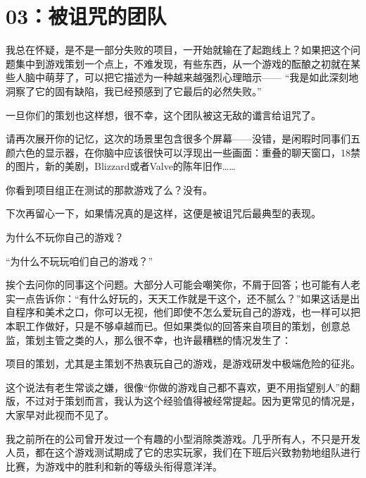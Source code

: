 \documentclass{article}
\begin{document}
{\centering\section*{03：被诅咒的团队}}





我总在怀疑，是不是一部分失败的项目，一开始就输在了起跑线上？如果把这个问题集中到游戏策划一个点上，不难发现，有些东西，从一个游戏的酝酿之初就在某些人脑中萌芽了，可以把它描述为一种越来越强烈心理暗示—— “我是如此深刻地洞察了它的固有缺陷，我已经预感到了它最后的必然失败。”



一旦你们的策划也这样想，很不幸，这个团队被这无敌的谶言给诅咒了。



请再次展开你的记忆，这次的场景里包含很多个屏幕——没错，是闲暇时同事们五颜六色的显示器，在你脑中应该很快可以浮现出一些画面：重叠的聊天窗口，18禁的图片，新的美剧，Blizzard或者Valve的陈年旧作……



你看到项目组正在测试的那款游戏了么？没有。



下次再留心一下，如果情况真的是这样，这便是被诅咒后最典型的表现。



为什么不玩你自己的游戏？



“为什么不玩玩咱们自己的游戏？”



挨个去问你的同事这个问题。大部分人可能会嘲笑你，不屑于回答；也可能有人老实一点告诉你：“有什么好玩的，天天工作就是干这个，还不腻么？”如果这话是出自程序和美术之口，你可以无视，他们即使不怎么爱玩自己的游戏，也一样可以把本职工作做好，只是不够卓越而已。但如果类似的回答来自项目的策划，创意总监，策划主管之类的人，那么很不幸，也许最糟糕的情况发生了：



项目的策划，尤其是主策划不热衷玩自己的游戏，是游戏研发中极端危险的征兆。



这个说法有老生常谈之嫌，很像“你做的游戏自己都不喜欢，更不用指望别人”的翻版，不过对于策划而言，我认为这个经验值得被经常提起。因为更常见的情况是，大家早对此视而不见了。



我之前所在的公司曾开发过一个有趣的小型消除类游戏。几乎所有人，不只是开发人员，都在这个游戏测试期成了它的忠实玩家，我们在下班后兴致勃勃地组队进行比赛，为游戏中的胜利和新的等级头衔得意洋洋。
\end{document}
